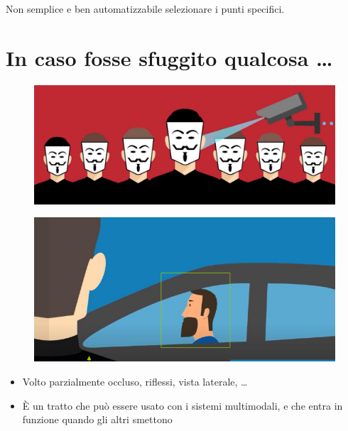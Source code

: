 \documentclass{report}
\begin{document}
\noindent Non semplice e ben automatizzabile
selezionare i punti specifici.

\newpage
\section{In caso fosse sfuggito qualcosa \dots}
\begin{figure}[H]
    \centering
    \includegraphics[width=1\linewidth]{images/orecchio-applicazione1.png}
\end{figure}

\begin{figure}[H]
    \centering
    \includegraphics[width=1\linewidth]{images/orecchio-applicazione2.png}
\end{figure}

\begin{itemize}
    \item Volto parzialmente occluso, riflessi, vista laterale, \dots
    \item È un tratto che può essere usato con i sistemi multimodali, e che entra in funzione 
    quando gli altri smettono
\end{itemize}
\end{document}
